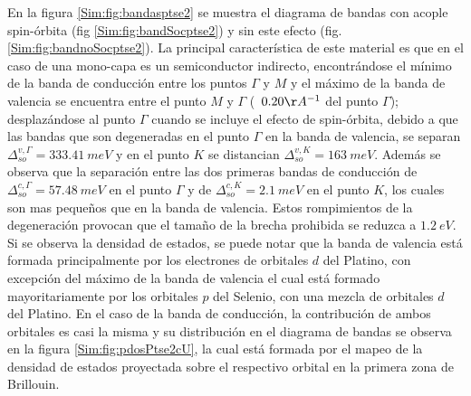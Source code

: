 En la figura \ref{Sim:fig:bandasptse2} se muestra el diagrama de bandas con acople spin-\'orbita (fig \ref{Sim:fig:bandSocptse2}) y sin este  efecto (fig. \ref{Sim:fig:bandnoSocptse2}). La principal caracter\'istica de este material es que en el caso de una mono-capa es un semiconductor indirecto, encontr\'andose el m\'inimo de la banda de conducci\'on entre los puntos $\Gamma$ y $M$ y el m\'aximo de la banda de valencia se encuentra entre el punto $M$ y $\Gamma$ (~$0.20 \AA^{-1}$ del punto $\Gamma$); desplazándose  al punto $\Gamma$ cuando se incluye el efecto de spin-\'orbita, debido a que  las bandas que son degeneradas en el punto $\Gamma$  en la banda de valencia,  se separan $\Delta_{so}^{v,\Gamma}=333.41 ~meV$ y en el punto $K$ se distancian $\Delta_{so}^{v,K}=163 ~meV$. Adem\'as  se observa que la separaci\'on entre las dos primeras bandas de conducci\'on de $\Delta_{so}^{c,\Gamma} = 57.48~ meV$ en el punto $\Gamma$ y de $\Delta_{so}^{c,K} = 2.1 ~meV$ en el punto $K$, los cuales son mas peque\~nos que en la banda de valencia. Estos rompimientos de la degeneraci\'on provocan que el tama\~no de la brecha prohibida se reduzca a $1.2 ~eV$. Si se observa la densidad de estados, se puede notar que la banda de valencia est\'a formada principalmente por los electrones de  orbitales $d$ del Platino, con excepci\'on  del m\'aximo de la banda de valencia el cual est\'a formado mayoritariamente por los orbitales $p$ del Selenio, con una mezcla de orbitales $d$ del Platino. En el caso de la banda de conducci\'on, la contribuci\'on de ambos orbitales es casi la misma y su distribuci\'on en el diagrama de bandas se observa en la figura \ref{Sim:fig:pdosPtse2cU}, la cual est\'a formada por el mapeo de la densidad de estados proyectada sobre el respectivo orbital en la primera zona de Brillouin.

